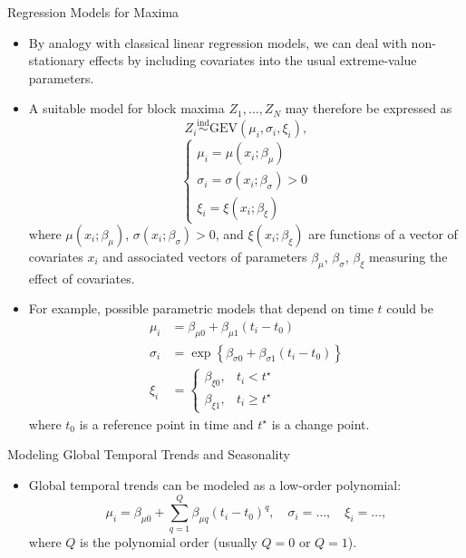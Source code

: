 \documentclass[10pt, hyperref={colorlinks = true,linkcolor = blue}]{beamer}
\begin{document}
{{{\begin{frame}{Regression Models for Maxima}
\footnotesize
\begin{itemize}
    \item By analogy with classical linear regression models, we can deal with non-stationary effects by including covariates into the usual extreme-value parameters.
    \item A suitable model for block maxima \(Z_1, \ldots, Z_N\) may therefore be expressed as
    \[
    Z_i \overset{\text{ind}}{\sim} \text{GEV}(\mu_i, \sigma_i, \xi_i),
    \]
    \[
    \begin{cases}
    \mu_i = \mu(x_i; \beta_\mu) \\
    \sigma_i = \sigma(x_i; \beta_\sigma) > 0 \\
    \xi_i = \xi(x_i; \beta_\xi)
    \end{cases}
    \]
    where \(\mu(x_i; \beta_\mu)\), \(\sigma(x_i; \beta_\sigma) > 0\), and \(\xi(x_i; \beta_\xi)\) are functions of a vector of covariates \(x_i\) and associated vectors of parameters \(\beta_\mu\), \(\beta_\sigma\), \(\beta_\xi\) measuring the effect of covariates.
    \item For example, possible parametric models that depend on time \(t\) could be
    \[
    \begin{aligned}
    \mu_i &= \beta_{\mu 0} + \beta_{\mu 1} (t_i - t_0) \\
    \sigma_i &= \exp \left\{ \beta_{\sigma 0} + \beta_{\sigma 1} (t_i - t_0) \right\} \\
    \xi_i &=
    \begin{cases}
    \beta_{\xi 0}, & t_i < t^\star \\
    \beta_{\xi 1}, & t_i \geq t^\star
    \end{cases}
    \end{aligned}
    \]
    where \(t_0\) is a reference point in time and \(t^\star\) is a change point.
\end{itemize}

\end{frame}


\begin{frame}{Modeling Global Temporal Trends and Seasonality}
\begin{itemize}
    \item Global temporal trends can be modeled as a low-order polynomial:
    \[
    \mu_i = \beta_{\mu 0} + \sum_{q=1}^{Q} \beta_{\mu q} (t_i - t_0)^q, \quad
    \sigma_i = \ldots, \quad \xi_i = \ldots,
    \]
    where \(Q\) is the polynomial order (usually \(Q = 0\) or \(Q = 1\)).


\end{itemize}
\end{frame}}}}
\end{document}
